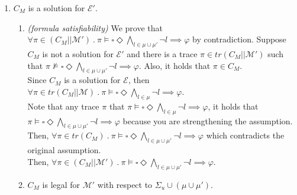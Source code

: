 \begin{enumerate}
    \item $C_M$ is a solution for $\mathcal{E'}$.
    \begin{enumerate}
        \item \textit{(formula satisfiability)} We  prove that 
        $\forall \pi \in (C_M || \mathcal{M'}) \ . \ \pi \vDash \square \Diamond \bigwedge_{l \in \mu \cup \mu'} \neg l \implies \varphi$ by contradiction. Suppose $C_M$ is not a solution for $\mathcal{E'}$ and there is a trace $\pi \in tr(C_M || \mathcal{M'})$ such that $\pi \nvDash 
        \square \Diamond \bigwedge_{l \in \mu \cup \mu'} \neg l \implies \varphi$. Also, it holds that $\pi \in C_M$.\\
        Since $C_M$ is a solution for $\mathcal{E}$, then $\forall \pi \in tr(C_M || \mathcal{M}) \ . \ \pi \vDash \square \Diamond \bigwedge_{l \in \mu} \neg l \implies \varphi$. \\
        Note that any trace $\pi$ that $\pi \vDash \square \Diamond \bigwedge_{l \in \mu} \neg l \implies \varphi$, it holds that \\ $\pi \vDash \square \Diamond \bigwedge_{l \in \mu \cup \mu'} \neg l  \implies \varphi$ because you are strengthening the assumption. Then, $\forall \pi \in tr(C_M) \ . \ \pi \vDash \square \Diamond \bigwedge_{l \in \mu \cup \mu'} \neg l \implies \varphi$ which contradicts the original assumption. \\
        Then, $\forall \pi \in (C_M || \mathcal{M'}) \ . \ \pi \vDash \square \Diamond \bigwedge_{l \in \mu \cup \mu'} \neg l \implies \varphi$.
        
        \item $C_M$ is legal for $\mathcal{M'}$ with respect to $\Sigma_u \cup (\mu \cup \mu')$.


\end{enumerate}
\end{enumerate}
